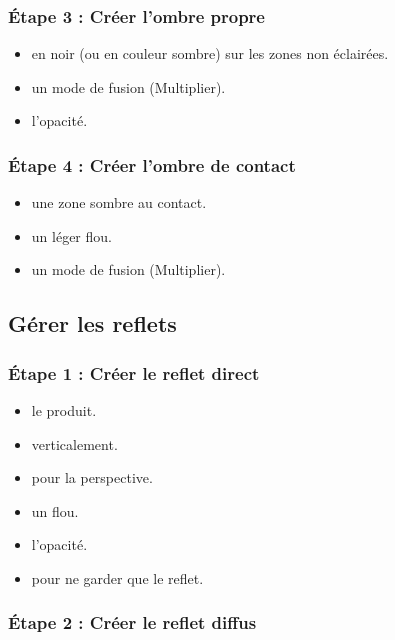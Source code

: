 \subsubsection{Étape 3 : Créer l'ombre propre}

\begin{itemize}
    \item {} en noir (ou en couleur sombre) sur les zones non éclairées.
    \item {} un mode de fusion (Multiplier).
    \item {} l'opacité.
\end{itemize}

\subsubsection{Étape 4 : Créer l'ombre de contact}

\begin{itemize}
    \item {} une zone sombre au contact.
    \item {} un léger flou.
    \item {} un mode de fusion (Multiplier).
\end{itemize}

\subsection{Gérer les reflets}

\subsubsection{Étape 1 : Créer le reflet direct}

\begin{itemize}
    \item {} le produit.
    \item {} verticalement.
    \item {} pour la perspective.
    \item {} un flou.
    \item {} l'opacité.
    \item {} pour ne garder que le reflet.
\end{itemize}

\subsubsection{Étape 2 : Créer le reflet diffus}

